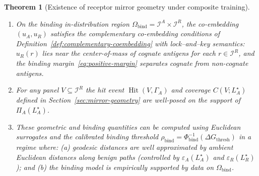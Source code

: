 \documentclass[11pt]{article}
\newcommand{\Ical}{\mathcal{I}}
\newcommand{\Hit}{\operatorname{Hit}}
\newtheorem{theorem}{Theorem}
\begin{document}
\begin{theorem}[Existence of receptor mirror geometry under composite training]
\begin{enumerate}
  \item[\textnormal{(ii)}] On the binding in-distribution region
    $\Omega_{\mathrm{bind}} = \Ical^A \times \Ical^R$, the co-embedding
    $(u_A,u_R)$ satisfies the complementary co-embedding conditions of
    Definition~\ref{def:complementary-coembedding} with lock–and–key semantics:
    $u_R(r)$ lies near the center-of-mass of cognate antigens for each
    $r \in \Ical^R$, and the binding margin~\eqref{eq:positive-margin}
    separates cognate from non-cognate antigens.

  \item[\textnormal{(iii)}] For any panel $V \subseteq \Ical^R$ the hit event
    $\Hit(V,\Gamma_A)$ and coverage $C(V;L_A^\star)$ defined in
    Section~\ref{sec:mirror-geometry} are well-posed on the support of
    $\Pi_A(L_A^\star)$.

  \item[\textnormal{(iv)}] These geometric and binding quantities can be
    computed using Euclidean surrogates and the calibrated binding threshold
    $\rho_{\mathrm{bind}} = \Phi_{\mathrm{bind}}^{-1}(\Delta G_{\mathrm{thresh}})$
    in a regime where: (a) geodesic distances are well approximated by ambient
    Euclidean distances along benign paths (controlled by
    $\varepsilon_A(L_A^\star)$ and $\varepsilon_R(L_R^\star)$); and (b) the
    binding model is empirically supported by data on $\Omega_{\mathrm{bind}}$.
\end{enumerate}
\end{theorem}
\end{document}
